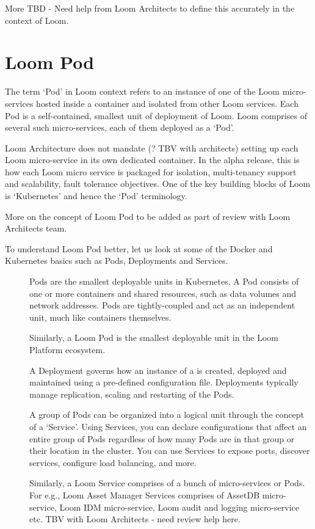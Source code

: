 \documentclass[letterpaper,10pt,english]{sphinxmanual}
\begin{document}
More TBD - Need help from Loom Architects to define this accurately in the context of Loom.


\section{Loom Pod}
\label{\detokenize{mcdmp_concepts:loom-pod}}\label{\detokenize{mcdmp_concepts:term-loom-pod}}
The term ‘Pod’ in Loom context refers to an instance of one of the Loom micro-services hosted inside a container and isolated from other Loom services. Each Pod is a self-contained, smallest unit of deployment of Loom.  Loom comprises of several such micro-services, each of them deployed as a ‘Pod’.

Loom Architecture does not mandate (? TBV with architects) setting up each Loom micro-service in its own dedicated container. In the alpha release, this is how each Loom micro service is packaged for isolation, multi-tenancy support and scalability, fault tolerance objectives. One of the key building blocks of Loom is ‘Kubernetes’ and hence the ‘Pod’ terminology.

More on the concept of Loom Pod to be added as part of review with Loom Architects team.

To understand Loom Pod better, let us look at some of the Docker and Kubernetes basics such as Pods, Deployments and Services.
\begin{description}
\item[{}] \leavevmode
Pods are the smallest deployable units in Kubernetes. A Pod consists of one or more containers and shared resources, such as data volumes and network addresses. Pods are tightly-coupled and act as an independent unit, much like containers themselves.

Similarly, a Loom Pod is the smallest deployable unit in the Loom Platform ecosystem.

\item[{}] \leavevmode
A Deployment governs how an instance of a  is created, deployed and maintained using a pre-defined configuration file. Deployments typically manage replication, scaling and restarting of the Pods.

\item[{}] \leavevmode
A group of Pods can be organized into a logical unit through the concept of a ‘Service’. Using Services, you can declare configurations that affect an entire group of Pods regardless of how many Pods are in that group or their location in the cluster. You can use Services to expose ports, discover services, configure load balancing, and more.

Similarly, a Loom Service comprises of a bunch of micro-services or Pods. For e.g., Loom Asset Manager Services comprises of AssetDB micro-service, Loom IDM micro-service, Loom audit and logging micro-service etc.  TBV with Loom Architects - need review help here.

\end{description}
\end{document}
